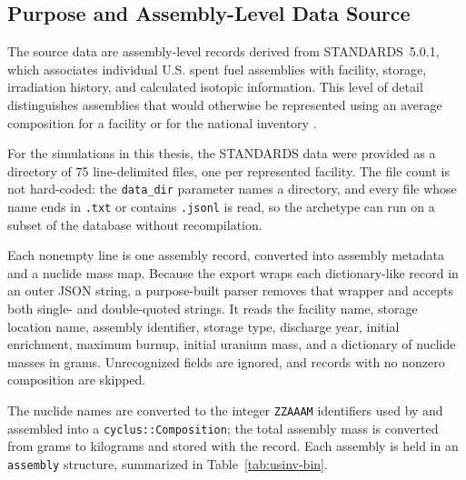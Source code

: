 \subsection{Purpose and Assembly-Level Data Source}
\label{subsec:us-inventory-data}

The source data are assembly-level records derived from \gls{STANDARDS}~5.0.1,
which associates individual U.S. spent fuel assemblies with facility, storage,
irradiation history, and calculated isotopic information. This level of detail
distinguishes assemblies that would otherwise be represented using an average
composition for a facility or for the national inventory
\cite{peterson_additional_2017,abdelkawy_summary_2025}.

For the simulations in this thesis, the \gls{STANDARDS} data were provided as a
directory of 75 line-delimited files, one per represented facility. The file
count is not hard-coded: the \texttt{data\_dir} parameter names a directory, and
every file whose name ends in \texttt{.txt} or contains \texttt{.jsonl} is read,
so the archetype can run on a subset of the database without recompilation.

Each nonempty line is one assembly record, converted into assembly metadata and a
nuclide mass map. Because the export wraps each dictionary-like record in an outer
JSON string, a purpose-built parser removes that wrapper and accepts both single-
and double-quoted strings. It reads the facility name, storage location name,
assembly identifier, storage type, discharge year, initial enrichment, maximum
burnup, initial uranium mass, and a dictionary of nuclide masses in grams.
Unrecognized fields are ignored, and records with no nonzero composition are
skipped.

The nuclide names are converted to the integer \texttt{ZZAAAM} identifiers used by
\Cyclus and assembled into a \texttt{cyclus::Composition}; the total assembly mass
is converted from grams to kilograms and stored with the record. Each assembly is
held in an \texttt{assembly} structure, summarized in Table~\ref{tab:usinv-bin}.

